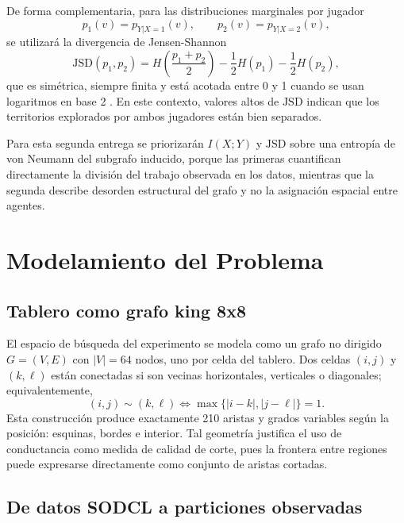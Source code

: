 \documentclass[conference]{IEEEtran}
\begin{document}
De forma complementaria, para las distribuciones marginales por jugador
\begin{equation}
p_1(v)=p_{Y|X=1}(v), \qquad p_2(v)=p_{Y|X=2}(v),
\end{equation}
se utilizará la divergencia de Jensen-Shannon
\begin{equation}
\mathrm{JSD}(p_1,p_2)=H\left(\frac{p_1+p_2}{2}\right)-\frac{1}{2}H(p_1)-\frac{1}{2}H(p_2),
\end{equation}
que es simétrica, siempre finita y está acotada entre 0 y 1 cuando se usan logaritmos en base 2 \cite{lin1991}. En este contexto, valores altos de $\mathrm{JSD}$ indican que los territorios explorados por ambos jugadores están bien separados.

Para esta segunda entrega se priorizarán $I(X;Y)$ y $\mathrm{JSD}$ sobre una entropía de von Neumann del subgrafo inducido, porque las primeras cuantifican directamente la división del trabajo observada en los datos, mientras que la segunda describe desorden estructural del grafo y no la asignación espacial entre agentes.

\section{Modelamiento del Problema}

\subsection{Tablero como grafo king 8x8}

El espacio de búsqueda del experimento se modela como un grafo no dirigido $G=(V,E)$ con $|V|=64$ nodos, uno por celda del tablero. Dos celdas $(i,j)$ y $(k,\ell)$ están conectadas si son vecinas horizontales, verticales o diagonales; equivalentemente,
\begin{equation}
(i,j)\sim(k,\ell) \iff \max\{|i-k|,|j-\ell|\}=1.
\end{equation}
Esta construcción produce exactamente 210 aristas y grados variables según la posición: esquinas, bordes e interior. Tal geometría justifica el uso de conductancia como medida de calidad de corte, pues la frontera entre regiones puede expresarse directamente como conjunto de aristas cortadas.

\subsection{De datos SODCL a particiones observadas}
\end{document}
